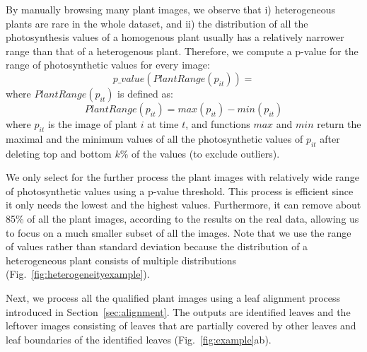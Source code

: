 \documentclass{bioinfo}
\begin{document}
\begin{methods}
By manually browsing many plant images, we observe that i) heterogeneous plants are rare in the whole dataset, and ii) the distribution of all the photosynthesis values of a homogenous plant usually has a relatively narrower range than that of a heterogenous plant.
%
Therefore, we compute a p-value for the range of photosynthetic values for every image:
%
\begin{equation}
p\_value(PlantRange(p_{it})) =
\end{equation}
\noindent where $PlantRange(p_{it})$ is defined as:
%
\begin{equation}
PlantRange(p_{it}) = max(p_{it}) - min(p_{it})
\end{equation}
%
\noindent where $p_{it}$ is the image of plant $i$ at time $t$, and functions $max$ and $min$ return the maximal and the minimum values of all the photosynthetic values of $p_{it}$ after deleting top and bottom $k\%$ of the values (to exclude outliers).

We only select for the further process the plant images with relatively wide range of photosynthetic values using a p-value threshold. This process is efficient since it only needs the lowest and the highest values. Furthermore, it can remove about 85\% of all the plant images, according to the results on the real data, allowing us to focus on a much smaller subset of all the images. Note that we use the range of values rather than standard deviation because the distribution of a heterogeneous plant consists of multiple distributions (Fig.~\ref{fig:heterogeneityexample}).


Next, we process all the qualified plant images using a leaf alignment process introduced in Section~\ref{sec:alignment}. The outputs are identified leaves and the leftover images consisting of leaves that are partially covered by other leaves and leaf boundaries of the identified leaves (Fig.~\ref{fig:example}ab).
%


\end{methods}
\end{document}
